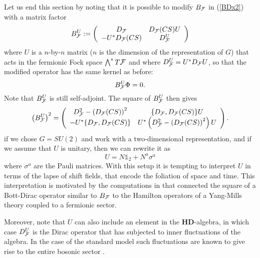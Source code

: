 \documentclass[letterpaper,11pt]{article}
\def\cf{{\cal F}}
\begin{document}
Let us end this section by noting that it is possible to modify $B_\cf$ in (\ref{BDx2}) with a matrix factor
\begin{eqnarray}
B^U_\cf :=   \left(
\begin{array}{cc}
 D_\cf  &  D_\cf(CS) U   \\ 
 -U^*D_\cf(CS)    &  D^U_\cf
\end{array}
\right)
\label{BDx22}
\end{eqnarray}
where $U$ is a $n$-by-$n$ matrix ($n$ is the dimension of the representation of $G$) that acts in the fermionic Fock space $\bigwedge^* T\cf$ and where $D_\cf^U= U^*D_\cf U$, so that the modified operator has the same kernel as before:
$$
B^U_\cf \Phi =0.
$$
Note that $B^U_\cf$ is still self-adjoint. The square of $B^U_\cf$ then gives
$$
\left(B^U_\cf\right)^2 =
\left(
\begin{array}{cc}
D_\cf^2 - \left(D_\cf(CS)\right)^2 & \{D_\cf, D_\cf(CS)\} U
\\
-U^*\{D_\cf, D_\cf(CS)\} & U^*\left( D_\cf^2  - \left(D_\cf(CS)\right)^2 \right) U
\end{array}
\right).
$$
if we chose $G=SU(2)$ and work with a two-dimensional representation, and if we assume that $U$ is unitary, then we can rewrite it as
$$
U = N \mathds{1}_2 + N^a \sigma^a
$$
where $\sigma^a$ are the Pauli matrices. With this setup it is tempting to interpret $U$ in terms of the lapse of shift fields, that encode the foliation of space and time. This interpretation is motivated by the computations in \cite{Aastrup:2020jcf} that connected the square of a Bott-Dirac operator similar to $B_\cf$ to the Hamilton operators of a Yang-Mills theory coupled to a fermionic sector. 

Moreover, note that $U$ can also include an element in the $\mathbf{HD}$-algebra, in which case $D^U_\cf$ is the Dirac operator that has subjected to inner fluctuations of the algebra. In the case of the standard model such fluctuations are known to give rise to the entire bosonic sector \cite{Connes:1996gi}. 
\end{document}
